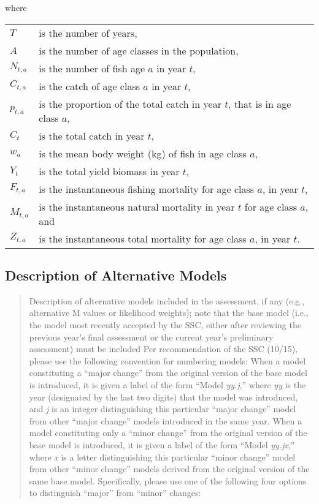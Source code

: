 \documentclass[
  11pt,
]{article}
\begin{document}
where

\begin{longtable}[]{@{}
  >{\raggedright\arraybackslash}p{}
  >{\raggedright\arraybackslash}p{}@{}}
\toprule()
\endhead
\(T\) & is the number of years, \\
\(A\) & is the number of age classes in the population, \\
\(N_{t,a}\) & is the number of fish age \(a\) in year \(t\), \\
\(C_{t,a}\) & is the catch of age class \(a\) in year \(t\), \\
\(p_{t,a}\) & is the proportion of the total catch in year \(t\), that is in age class \(a\), \\
\(C_{t}\) & is the total catch in year \(t\), \\
\(w_{a}\) & is the mean body weight (kg) of fish in age class \(a\), \\
\(Y_{t}\) & is the total yield biomass in year \(t\), \\
\(F_{t,a}\) & is the instantaneous fishing mortality for age class \(a\), in year \(t\), \\
\(M_{t,a}\) & is the instantaneous natural mortality in year \(t\) for age class \(a\), and \\
\(Z_{t,a}\) & is the instantaneous total mortality for age class \(a\), in year \(t\). \\
\bottomrule()
\end{longtable}

\hypertarget{description-of-alternative-models}{%
\subsection{Description of Alternative Models}\label{description-of-alternative-models}}

\begin{quote}
Description of alternative models included in the assessment, if any (e.g., alternative M values or likelihood weights); note that the base model (i.e., the model most recently accepted by the SSC, either after reviewing the previous year's final assessment or the current year's preliminary assessment) must be included
Per recommendation of the SSC (10/15), please use the following convention for numbering models:
When a model constituting a ``major change'' from the original version of the base model is introduced, it is given a label of the form ``Model \emph{yy.j},'' where \emph{yy} is the year (designated by the last two digits) that the model was introduced, and \emph{j} is an integer distinguishing this particular ``major change'' model from other ``major change'' models introduced in the same year.
When a model constituting only a ``minor change'' from the original version of the base model is introduced, it is given a label of the form ``Model \emph{yy.jx},'' where \emph{x} is a letter distinguishing this particular ``minor change'' model from other ``minor change'' models derived from the original version of the same base model.
Specifically, please use one of the following four options to distinguish ``major'' from ``minor'' changes:
\end{quote}
\end{document}

